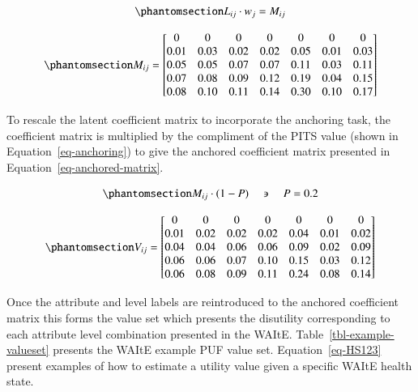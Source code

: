 \documentclass[
  number,
  preprint]{elsarticle}
\begin{document}
\begin{equation}\phantomsection\label{eq-element-wise-multiplication}{
    L_{ij} \cdot  w_{j} = {M}_{ij}
}\end{equation}

\begin{equation}\phantomsection\label{eq-coeff-matrix}{
M_{ij} =  
\begin{bmatrix}
0 & 0 & 0 & 0 & 0 & 0 & 0 \\
0.01 & 0.03 & 0.02 & 0.02 & 0.05 & 0.01 & 0.03 \\
0.05 & 0.05 & 0.07 & 0.07 & 0.11 & 0.03 & 0.11 \\
0.07 & 0.08 & 0.09 & 0.12 & 0.19 & 0.04 & 0.15 \\
0.08 & 0.10 & 0.11 & 0.14 & 0.30 & 0.10 & 0.17
\end{bmatrix}
}\end{equation}

To rescale the latent coefficient matrix to incorporate the anchoring
task, the coefficient matrix is multiplied by the compliment of the PITS
value (shown in Equation~\ref{eq-anchoring}) to give the anchored
coefficient matrix presented in Equation~\ref{eq-anchored-matrix}.

\begin{equation}\phantomsection\label{eq-anchoring}{
    M_{ij} \cdot (1-P) \quad \backepsilon \quad P = 0.2 
}\end{equation}

\begin{equation}\phantomsection\label{eq-anchored-matrix}{
V_{ij} =  
\begin{bmatrix}
0 & 0 & 0 & 0 & 0 & 0 & 0 \\
0.01 & 0.02 & 0.02 & 0.02 & 0.04 & 0.01 & 0.02 \\
0.04 & 0.04 & 0.06 & 0.06 & 0.09 & 0.02 & 0.09 \\
0.06 & 0.06 & 0.07 & 0.10 & 0.15 & 0.03 & 0.12 \\
0.06 & 0.08 & 0.09 & 0.11 & 0.24 & 0.08 & 0.14 \\
\end{bmatrix}
}\end{equation}

Once the attribute and level labels are reintroduced to the anchored
coefficient matrix this forms the value set which presents the
disutility corresponding to each attribute level combination presented
in the WAItE. Table~\ref{tbl-example-valueset} presents the WAItE
example PUF value set. Equation~\ref{eq-HS123} present examples of how
to estimate a utility value given a specific WAItE health state.
\end{document}
